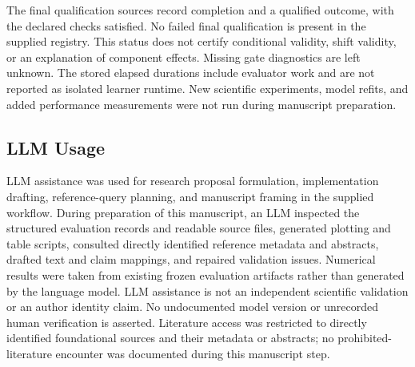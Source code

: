 \documentclass{article}
\begin{document}
The final qualification sources record completion and a qualified outcome, with the declared checks satisfied. No failed final qualification is present in the supplied registry. This status does not certify conditional validity, shift validity, or an explanation of component effects. Missing gate diagnostics are left unknown. The stored elapsed durations include evaluator work and are not reported as isolated learner runtime. New scientific experiments, model refits, and added performance measurements were not run during manuscript preparation.

\subsection*{LLM Usage}
LLM assistance was used for research proposal formulation, implementation drafting, reference-query planning, and manuscript framing in the supplied workflow. During preparation of this manuscript, an LLM inspected the structured evaluation records and readable source files, generated plotting and table scripts, consulted directly identified reference metadata and abstracts, drafted text and claim mappings, and repaired validation issues. Numerical results were taken from existing frozen evaluation artifacts rather than generated by the language model. LLM assistance is not an independent scientific validation or an author identity claim. No undocumented model version or unrecorded human verification is asserted. Literature access was restricted to directly identified foundational sources and their metadata or abstracts; no prohibited-literature encounter was documented during this manuscript step.
\end{document}
